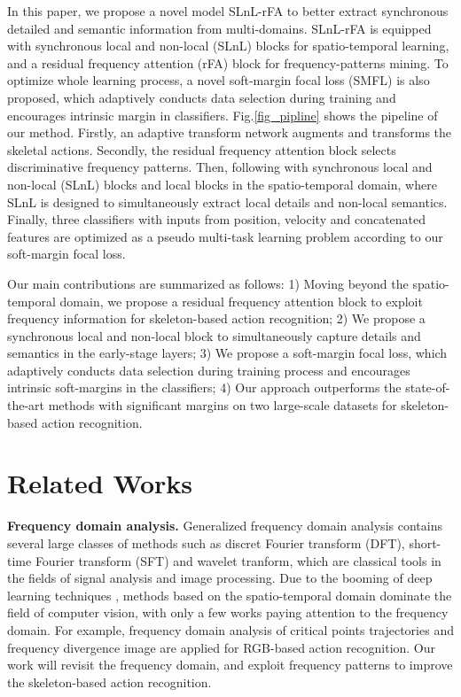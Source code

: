 \documentclass{article}
\begin{document}
In this paper, we propose a novel model SLnL-rFA to better extract synchronous detailed and semantic information from multi-domains. SLnL-rFA is equipped with synchronous local and non-local (SLnL) blocks for spatio-temporal learning, and a residual frequency attention (rFA) block for frequency-patterns mining. To optimize whole learning process, a novel soft-margin focal loss (SMFL) is also proposed, which adaptively conducts data selection during training and encourages intrinsic margin in classifiers. Fig.\ref{fig_pipline} shows the pipeline of our method. Firstly, an adaptive transform network augments and transforms the skeletal actions. Secondly, the residual frequency attention block selects discriminative frequency patterns. Then, following with  synchronous local and non-local (SLnL) blocks and  local blocks in the spatio-temporal domain, where SLnL is designed to simultaneously extract local details and non-local semantics. Finally, three classifiers with inputs from position, velocity and concatenated features are optimized as a pseudo
multi-task learning problem according to our soft-margin focal loss.

Our main contributions are summarized as follows: 1) Moving beyond the spatio-temporal domain, we propose a residual frequency attention block to exploit frequency information for skeleton-based action recognition; 2) We propose a synchronous local and non-local block to simultaneously capture details and semantics in the early-stage layers; 3) We propose a soft-margin focal loss, which adaptively conducts data selection during training process and encourages intrinsic soft-margins in the classifiers; 4) Our approach outperforms the state-of-the-art methods with significant margins on two large-scale datasets for skeleton-based action recognition.




\section{Related Works}
\textbf{Frequency domain analysis.}
Generalized frequency domain analysis contains several large classes of methods such as discret Fourier transform (DFT), short-time Fourier transform (SFT) and wavelet tranform, which are classical tools in the fields of signal analysis and image processing. Due to the booming of deep learning techniques \cite{DBLP:conf/nips/KrizhevskySH12,DBLP:conf/cvpr/HeZRS16}, methods based on the spatio-temporal domain dominate the field of computer vision, with only a few works paying attention to the frequency domain. For example, frequency domain analysis of critical points trajectories \cite{DBLP:conf/icip/BeaudryPM14} and frequency divergence image \cite{DBLP:conf/isbi/CruzS17} are applied for RGB-based action recognition. Our work will revisit the frequency domain, and exploit frequency patterns to improve the skeleton-based action recognition.
\end{document}
